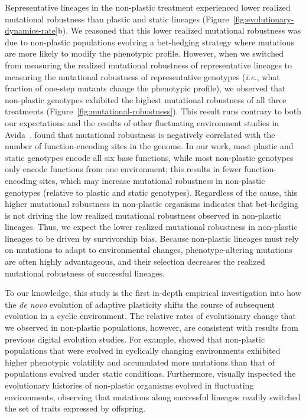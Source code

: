 \begin{raggedbottom}
Representative lineages in the non-plastic treatment experienced lower realized mutational robustness than plastic and static lineages (Figure~\ref{fig:evolutionary-dynamics-rate}b).
We reasoned that this lower realized mutational robustness was due to non-plastic populations evolving a bet-hedging strategy where mutations are more likely to modify the phenotypic profile.
However, when we switched from measuring the realized mutational robustness of representative lineages to measuring the mutational robustness of representative genotypes (\textit{i.e.}, what fraction of one-step mutants change the phenotypic profile), we observed that non-plastic genotypes exhibited the highest mutational robustness of all three treatments (Figure~\ref{fig:mutational-robustness}).
This result runs contrary to both our expectations and the results of other fluctuating environment studies in Avida~\citep{canino-koning_fluctuating_2019}.
\cite{canino-koning_fluctuating_2019} found that mutational robustness is negatively correlated with the number of function-encoding sites in the genome.
In our work, most plastic and static genotypes encode all six base functions, while most non-plastic genotypes only encode functions from one environment; this results in fewer function-encoding sites, which may increase mutational robustness in non-plastic genotypes (relative to plastic and static genotypes). %
Regardless of the cause, this higher mutational robustness in non-plastic organisms indicates that bet-hedging is not driving the low realized mutational robustness observed in non-plastic lineages.
Thus, we expect the lower realized mutational robustness in non-plastic lineages to be driven by survivorship bias.
Because non-plastic lineages must rely on mutations to adapt to environmental changes, phenotype-altering mutations are often highly advantageous, and their selection decreases the realized mutational robustness of successful lineages.


To our knowledge, this study is the first in-depth empirical investigation into how the \textit{de novo} evolution of adaptive plasticity shifts the course of subsequent evolution in a cyclic environment.
The relative rates of evolutionary change that we observed in non-plastic populations, however, are consistent with results from previous digital evolution studies.
For example, \cite{dolson_interpreting_2020} showed that non-plastic populations that were evolved in cyclically changing environments exhibited higher phenotypic volatility and accumulated more mutations than that of populations evolved under static conditions.
Furthermore, \cite{lalejini_evolutionary_2016} visually inspected the evolutionary histories of non-plastic organisms evolved in fluctuating environments, observing that mutations along successful lineages readily switched the set of traits expressed by offspring.



\end{raggedbottom}
